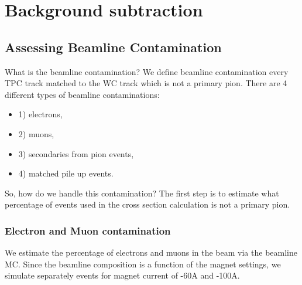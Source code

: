 \chapter{Background subtraction}
\section{Assessing Beamline Contamination}
What is the beamline contamination? We define beamline contamination every TPC track matched to the WC track which is not a primary pion. There are 4 different types of beamline contaminations:
\begin{itemize}
\item[]1) electrons,
\item[]2) muons,
\item[]3) secondaries from pion events,
\item[]4) matched pile up events.
\end{itemize}

So, how do we handle this contamination?
The first step is to estimate what percentage of events used in the cross section calculation is not a primary pion.  

\subsection{Electron and Muon contamination}
We estimate the percentage of electrons and muons in the beam via the beamline MC. 
Since the beamline composition is a function of the magnet settings, we simulate separately events for magnet current of -60A and -100A. 

